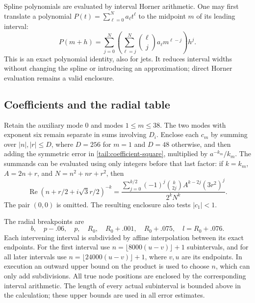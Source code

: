 Spline polynomials are evaluated by interval Horner arithmetic.
One may first translate a polynomial $P(t)=\sum_{\ell=0}^Na_\ell
t^\ell$ to the midpoint $m$ of its leading interval:
\begin{equation}\label{comp:polynomial-shift}
 P(m+h)=\sum_{j=0}^N
   \left(\sum_{\ell=j}^N\binom{\ell}{j}a_\ell m^{\ell-j}\right)h^j.
\end{equation}
This is an exact polynomial identity, also for jets.  It reduces
interval widths without changing the spline or introducing an
approximation; direct Horner evaluation remains a valid enclosure.

\subsection{Coefficients and the radial table}
\label{comp:radial-table}

Retain the auxiliary mode $0$ and modes $1\le m\le38$.
The two modes with exponent six remain separate in sums involving
$D_i$.  Enclose each $c_m$ by summing over
$|n|,|r|\le D$, where $D=256$ for $m=1$ and $D=48$ otherwise,
and then adding the symmetric error in
\eqref{tail:coefficient-square}, multiplied by $a^{-k_m}/k_m$.
The summands can be evaluated using only integers before that last
factor: if $k=k_m$, $A=2n+r$, and $N=n^2+nr+r^2$, then
\begin{equation}\label{comp:coefficient-summand}
 \operatorname{Re}(n+r/2+i\sqrt3r/2)^{-k}
 =\frac{\displaystyle\sum_{j=0}^{k/2}(-1)^j
       \binom{k}{2j}A^{k-2j}(3r^2)^j}{2^kN^k}.
\end{equation}
The pair $(0,0)$ is omitted.  The resulting enclosure also tests
$|c_1|<1$.

The radial breakpoints are
\begin{equation}\label{comp:breakpoints}
 b,\quad p-.06,\quad p,\quad R_0,\quad R_0+.001,
       \quad R_0+.075,\quad l=R_0+.076.
\end{equation}
Each intervening interval is subdivided by affine interpolation
between its exact endpoints.  For the first interval use
$n=\lfloor8000(u-v)\rfloor+1$ subintervals, and for all later
intervals use $n=\lfloor24000(u-v)\rfloor+1$, where $v,u$ are its
endpoints.  In execution an outward upper bound on the product is
used to choose $n$, which can only add subdivisions.  All true node
positions are enclosed by the corresponding interval arithmetic.
The length of every actual subinterval is bounded above in the
calculation; these upper bounds are used in all error estimates.


